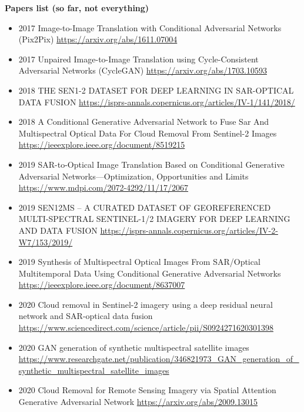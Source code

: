 \textbf{Papers list (so far, not everything)}
\begin{itemize}
    \item 2017 Image-to-Image Translation with Conditional Adversarial Networks (Pix2Pix)
    \url{https://arxiv.org/abs/1611.07004}

    \item 2017 Unpaired Image-to-Image Translation using Cycle-Consistent Adversarial Networks (CycleGAN)
    \url{https://arxiv.org/abs/1703.10593}

    \item 2018 THE SEN1-2 DATASET FOR DEEP LEARNING IN SAR-OPTICAL DATA FUSION
    \url{https://isprs-annals.copernicus.org/articles/IV-1/141/2018/}

    \item 2018 A Conditional Generative Adversarial Network to Fuse Sar And Multispectral Optical Data For Cloud Removal From Sentinel-2 Images
    \url{https://ieeexplore.ieee.org/document/8519215}

    \item 2019 SAR-to-Optical Image Translation Based on Conditional Generative Adversarial Networks—Optimization, Opportunities and Limits
    \url{https://www.mdpi.com/2072-4292/11/17/2067}

    \item 2019 SEN12MS – A CURATED DATASET OF GEOREFERENCED MULTI-SPECTRAL SENTINEL-1/2 IMAGERY FOR DEEP LEARNING AND DATA FUSION
    \url{https://isprs-annals.copernicus.org/articles/IV-2-W7/153/2019/}

    \item 2019 Synthesis of Multispectral Optical Images From SAR/Optical Multitemporal Data Using Conditional Generative Adversarial Networks
    \url{https://ieeexplore.ieee.org/document/8637007}

    \item 2020 Cloud removal in Sentinel-2 imagery using a deep residual neural network and SAR-optical data fusion
    \url{https://www.sciencedirect.com/science/article/pii/S0924271620301398}

    \item 2020 GAN generation of synthetic multispectral satellite images
    \url{https://www.researchgate.net/publication/346821973_GAN_generation_of_synthetic_multispectral_satellite_images}
    
    \item 2020 Cloud Removal for Remote Sensing Imagery via Spatial Attention Generative Adversarial Network
    \url{https://arxiv.org/abs/2009.13015}


\end{itemize}

